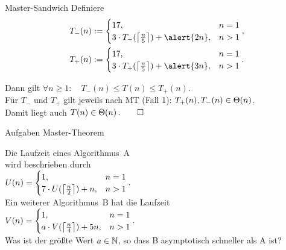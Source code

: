 \begin{frame}{Master-Sandwich}
	\solutionheading 
	 Definiere 
	 \begin{align*}
		T_-(n) &:= 
		\begin{cases}
		17,                           			   &n = 1 \\
		3 \cdot T_-(\ceil{\frac{n}{5}}) + \alert{2n},  &  n > 1
		\end{cases}, \\
		T_+(n) &:= 
		\begin{cases}
		17,                           			   &n = 1 \\
		3 \cdot T_+(\ceil{\frac{n}{5}}) + \alert{3n} ,  &  n > 1
		\end{cases}.
	\end{align*}
		
	\medskip
	Dann gilt $\forall n \geq 1: \quad T_-(n) \leq T(n) \leq T_+(n)$.\\
	Für $T_-$ und $T_+$ gilt jeweils nach MT (Fall 1): \quad $ T_+(n), T_-(n) \in \Theta\!\left(n\right)$.\\
	Damit liegt auch $T(n) \in \Theta\!\left(n\right). \qed$
		
\end{frame}

\begin{frame}{Aufgaben Master-Theorem}
	\begin{wrapfigure}{r}[-.2\baselineskip]{.38\textwidth}
		\fbox{\mastertheoreminder}
	\end{wrapfigure}
	Die Laufzeit eines Algorithmus~A \\
	wird beschrieben durch \\ \smallskip
	\begin{math}
	U(n) = 
	\begin{cases}
	1,                           			   &n = 1 \\
	7 \cdot U(\left\lceil\frac{n}{2}\right\rceil) + n,  &  n > 1
	\end{cases}.
	\end{math} \\ \bigskip
	Ein weiterer Algorithmus~B hat die Laufzeit \\ \smallskip
	\begin{math}
	V(n) = 
	\begin{cases}
	1,                            				& n = 1 \\
	a \cdot V(\left\lceil\frac{n}{4}\right\rceil) + 5n,  & n > 1
	\end{cases}.
	\end{math} \\ \bigskip
	Was ist der größte Wert $a \in \mathbb{N}$, so dass B asymptotisch schneller als A ist?
\end{frame}

